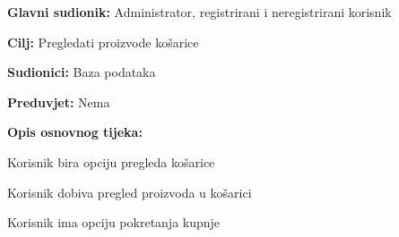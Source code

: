 					\noindent {}
					\begin{packed_item}
						
						\item \textbf{Glavni sudionik: }Administrator, registrirani i neregistrirani korisnik
						\item  \textbf{Cilj:} Pregledati proizvode košarice
						\item  \textbf{Sudionici:} Baza podataka
						\item  \textbf{Preduvjet:} Nema
						\item  \textbf{Opis osnovnog tijeka:}
						
						\item[] \begin{packed_enum}
							
							\item Korisnik bira opciju pregleda košarice
							\item Korisnik dobiva pregled proizvoda u košarici
							\item Korisnik ima opciju pokretanja kupnje 
						\end{packed_enum}
						
					\end{packed_item}
				
